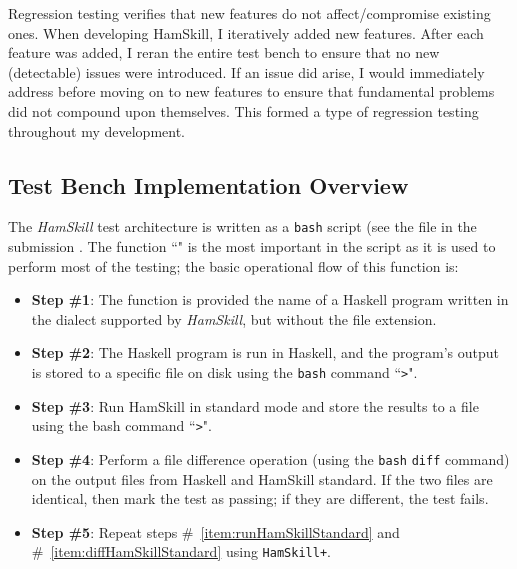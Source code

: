 \documentclass{report}
\begin{document}
Regression testing verifies that new features do not affect/compromise existing ones.  When developing HamSkill, I iteratively added new features.  After each feature was added, I reran the entire test bench to ensure that no new (detectable) issues were introduced.  If an issue did arise, I would immediately address before moving on to new features to ensure that fundamental problems did not compound upon themselves. This formed a type of regression testing throughout my development.

\subsection{Test Bench Implementation Overview}

The \textit{HamSkill} test architecture is written as a \texttt{bash} script (see the file in the submission .  The function ``" is the most important in the script as it is used to perform most of the testing; the basic operational flow of this function is:

\begin{itemize}

\item \textbf{Step \#1}: The function is provided the name of a Haskell program written in the dialect supported by \textit{HamSkill}, but without the file extension.

\item \textbf{Step \#2}: The Haskell program is run in Haskell, and the program's output is stored to a specific file on disk using the \texttt{bash} command ``\texttt{>}". 

\item\label{item:runHamSkillStandard} \textbf{Step \#3}: Run HamSkill in standard mode and store the results to a file using the bash command ``\texttt{>}". 

\item\label{item:diffHamSkillStandard} \textbf{Step \#4}: Perform a file difference operation (using the \texttt{bash} \texttt{diff} command) on the output files from Haskell and HamSkill standard.  If the two files are identical, then mark the test as passing; if they are different, the test fails.
 
\item \textbf{Step \#5}: Repeat steps \#~\ref{item:runHamSkillStandard} and \#~\ref{item:diffHamSkillStandard} using \texttt{HamSkill+}.

\end{itemize}
\end{document}
